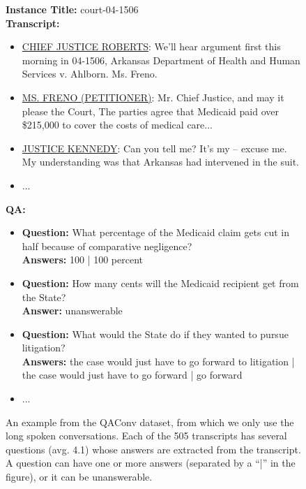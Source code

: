 \begin{figure*}[t]
    \centering
    \begin{tcolorbox}[
      title=QAConv Example,
      colframe=blue!50!black,
      colback=blue!5!white,
      coltitle=white,
      fonttitle=\bfseries,
      boxrule=0.5mm,
      width=\textwidth,
      sharp corners%
    ]

    \textbf{Instance Title:} court-04-1506 \\

    \textbf{Transcript:}
    \begin{itemize}
      \item \underline{CHIEF JUSTICE ROBERTS}: We'll hear argument first this morning in 04-1506, Arkansas Department of Health and Human Services v. Ahlborn. Ms. Freno.
      \item \underline{MS. FRENO (PETITIONER)}: Mr. Chief Justice, and may it please the Court, The parties agree that Medicaid paid over \$215,000 to cover the costs of medical care...
      \item \underline{JUSTICE KENNEDY}: Can you tell me? It's my -- excuse me. My understanding was that Arkansas had intervened in the suit.
      \item ...
    \end{itemize}

    \vspace{0.5em}

    \textbf{QA:} 
    \begin{itemize}
        \item \textbf{Question:} What percentage of the Medicaid claim gets cut in half because of comparative negligence?\\
        \textbf{Answers:} 100 | 100 percent
        \item \textbf{Question:} How many cents will the Medicaid recipient get from the State?\\
        \textbf{Answer:} unanswerable
        \item \textbf{Question:} What would the State do if they wanted to pursue litigation?\\
        \textbf{Answers:} the case would just have to go forward to litigation | the case would just have to go forward | go forward
        \item ...
    \end{itemize}

    \end{tcolorbox}
    \caption{An example from the QAConv dataset, from which we only use the long spoken conversations. Each of the 505 transcripts has several questions (avg. 4.1) whose answers are extracted from the transcript. A question can have one or more answers (separated by a ``|'' in the figure), or it can be unanswerable.}
    \label{fig_qaconv_example}
\end{figure*}
